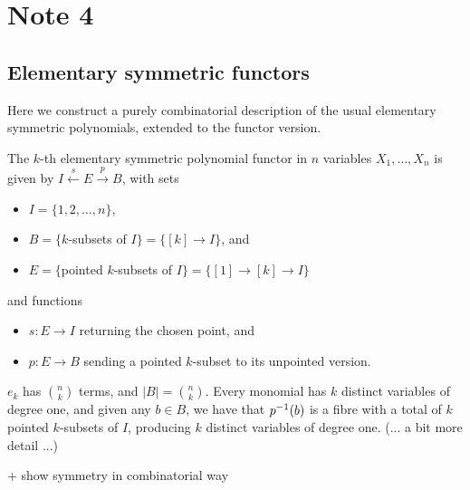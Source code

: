 
\pagebreak

\section{Note 4}

\subsection{Elementary symmetric functors}

Here we construct a purely combinatorial description of the usual elementary symmetric polynomials, extended to the functor version.

\begin{exercise}
The $k$-th elementary symmetric polynomial functor in $n$ variables $X_1,\dots,X_n$ is given by $I\overset{s}{\gets} E\overset{p}{\to} B$, with sets
\begin{itemize}
\item $I=\{1,2,\dots,n\}$,
\item $B=\{k$-subsets of $I\} = \{[k] \to I\}$, and
\item $E=\{$pointed $k$-subsets of $I\} = \{[1] \to [k] \to I\}$
\end{itemize}
and functions
\begin{itemize}
\item $s:E\to I$ returning the chosen point, and
\item $p:E\to B$ sending a pointed $k$-subset to its unpointed version.
\end{itemize}
\end{exercise}
\begin{solution}
$e_k$ has $\binom{n}{k}$ terms, and $|B|=\binom{n}{k}$. Every monomial has $k$ distinct variables of degree one, and given any $b\in B$, we have that $p^{-1}(b)$ is a fibre with a total of $k$ pointed $k$-subsets of $I$, producing $k$ distinct variables of degree one. (... a bit more detail ...)

+ show symmetry in combinatorial way
\end{solution}


